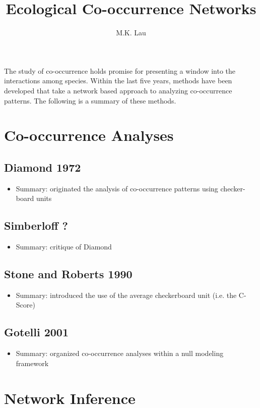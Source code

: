 \documentclass[12pt]{article}
\title{Ecological Co-occurrence Networks}
\author{M.K. Lau}
\begin{document}
\maketitle

\setcounter{tocdepth}{3}  %
\tableofcontents

The study of co-occurrence holds promise for presenting a window into
the interactions among species. Within the last five years, methods
have been developed that take a network based approach to analyzing
co-occurrence patterns. The following is a summary of these methods.

\section{Co-occurrence Analyses}
\subsection{Diamond 1972}
\begin{itemize}
\item Summary: originated the analysis of co-occurrence patterns using
  checker-board units
\end{itemize}
\subsection{Simberloff ?}
\begin{itemize}
\item Summary: critique of Diamond
\end{itemize}
\subsection{Stone and Roberts 1990}
\begin{itemize}
\item Summary: introduced the use of the average checkerboard unit
  (i.e. the C-Score)
\end{itemize}
\subsection{Gotelli 2001}
\begin{itemize}
\item Summary: organized co-occurrence analyses within a null modeling
  framework
\end{itemize}

\section{Network Inference}
\end{document}
